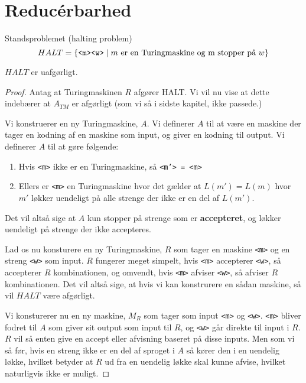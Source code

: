 \chapter{Reducérbarhed}

Standsproblemet (halting problem) $$HALT = \{\text{\texttt{<m><w>}} \mid m \text{ er en Turingmaskine og m stopper på }w\}$$

\begin{theorem}
	$HALT$ er uafgørligt.
\end{theorem}

\begin{proof}
	Antag at Turingmaskinen $R$ afgører HALT. Vi vil nu vise at dette indebærer at $A_{TM}$ er afgørligt (som vi så i sidste kapitel, ikke passede.)

	Vi konstruerer en ny Turingmaskine, $A$. Vi definerer $A$ til at være en maskine der tager en kodning af en maskine som input, og giver en kodning til output. Vi definerer $A$ til at gøre følgende:
	\begin{enumerate}
		\item Hvis \texttt{<m>} ikke er en Turingmaskine, så \texttt{<m'> = <m>}
		\item Ellers er \texttt{<m>} en Turingmaskine hvor det gælder at $L(m') = L(
			      m)$ hvor $m'$ løkker uendeligt på alle strenge der ikke er en del af $L(m')$.
	\end{enumerate}

	Det vil altså sige at $A$ kun stopper på strenge som er \textbf{accepteret}, og løkker uendeligt på strenge der ikke accepteres.

	Lad os nu konsturere en ny Turingmaskine, $R$ som tager en maskine \texttt{<m>} og en streng \texttt{<w>} som input. $R$ fungerer meget simpelt, hvis \texttt{<m>} accepterer \texttt{<w>}, så accepterer $R$ kombinationen, og omvendt, hvis \texttt{<m>} afviser \texttt{<w>}, så afviser $R$ kombinationen. Det vil altså sige, at hvis vi kan konstrurere en sådan maskine, så vil $HALT$ være afgørligt.

	Vi konsturerer nu en ny maskine, $M_{R}$ som tager som input \texttt{<m>} og \texttt{<w>}. \texttt{<m>} bliver fodret til $A$ som giver sit output som input til $R$, og \texttt{<w>} går direkte til input i $R$. $R$ vil så enten give en accept eller afvisning baseret på disse inputs. Men som vi så før, hvis en streng ikke er en del af sproget i $A$ så kører den i en uendelig løkke, hvilket betyder at $R$ ud fra en uendelig løkke skal kunne afvise, hvilket naturligvis ikke er muligt.

\end{proof}

